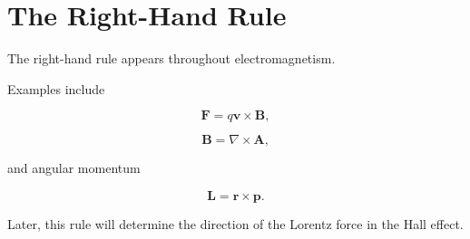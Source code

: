 \section{The Right-Hand Rule}

The right-hand rule appears throughout electromagnetism.

Examples include

\[
\mathbf F=q\mathbf v\times\mathbf B,
\]

\[
\mathbf B=\nabla\times\mathbf A,
\]

and angular momentum

\[
\mathbf L
=
\mathbf r\times\mathbf p.
\]

Later, this rule will determine the direction of the Lorentz force in the Hall effect.

